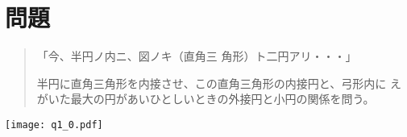 \section*{問題}

\begin{quotation}
 「今、半円ノ内ニ、図ノキ（直角三
 角形）ト二円アリ・・・」

 半円に直角三角形を内接させ、この直角三角形の内接円と、弓形内に
 えがいた最大の円があいひとしいときの外接円と小円の関係を問う。
\end{quotation}

\begin{center}
\texttt{[image: q1\_0.pdf]}
\end{center}
